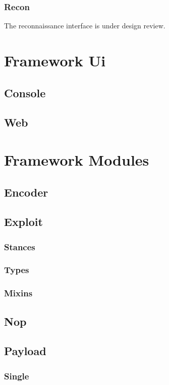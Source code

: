 \documentclass{report}
\begin{document}
        \subsection{Recon}

\par
The reconnaissance interface is under design review.

\chapter{Framework Ui}
    \section{Console}
    \section{Web}
\chapter{Framework Modules}
\label{framework-modules}

    \section{Encoder}
    \section{Exploit}
        \subsection{Stances}
        \subsection{Types}
        \subsection{Mixins}
    \section{Nop}
    \section{Payload}
        \subsection{Single}
\end{document}
